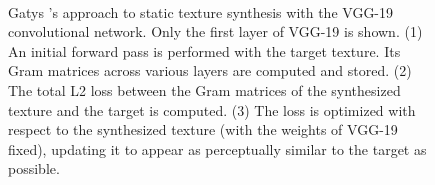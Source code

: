 \begin{figure}[t]
\begin{center}
	\\
	\caption[Static texture synthesis with a convolutional network]{Gatys \etal's \cite{gatys2015} approach to static texture synthesis with the VGG-19 \cite{simonyan2014very} convolutional network. Only the first layer of VGG-19 is shown. (1) An initial forward pass is
performed with the target texture. Its Gram matrices
across various layers are computed and stored. (2) The total L2 loss between the Gram matrices of the synthesized texture and the target is computed. (3) The loss is optimized with respect to the synthesized texture (with the weights of VGG-19 fixed), updating it to appear as perceptually similar to the target as possible.}
	\vspace{-0.65cm}
	\label{fig:vgg_texture_synthesis}
\end{center}
\end{figure}